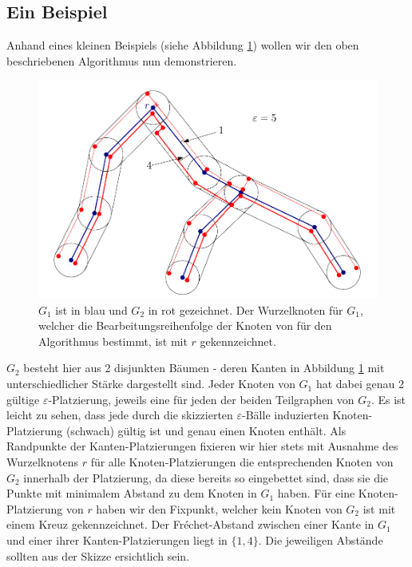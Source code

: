 \documentclass[a4paper, 12pt, twoside]{article}
\theoremstyle{Format1} %
\begin{document}
\subsection{Ein Beispiel}
Anhand eines kleinen Beispiels (siehe Abbildung \ref{min_sum_tree_0}) wollen wir den oben beschriebenen Algorithmus nun demonstrieren.

\begin{figure}[H]
    \centering
    \includegraphics[width=\textwidth]{min_sum_tree_0.pdf}
    \caption{$G_1$ ist in blau und $G_2$ in rot gezeichnet. Der Wurzelknoten für $G_1$, welcher die Bearbeitungsreihenfolge der Knoten von für den Algorithmus bestimmt,
	ist mit $r$ gekennzeichnet.
	}
    \label{min_sum_tree_0}
\end{figure}

$G_2$ besteht hier aus 2 disjunkten Bäumen - deren Kanten in Abbildung \ref{min_sum_tree_0} mit unterschiedlicher Stärke dargestellt sind.
Jeder Knoten von $G_1$ hat dabei genau 2 gültige $\varepsilon$-Platzierung, jeweils eine für jeden der beiden Teilgraphen von $G_2$.
Es ist leicht zu sehen, dass jede durch die skizzierten $\varepsilon$-Bälle induzierten Knoten-Platzierung (schwach) gültig ist und genau einen Knoten enthält.
Als Randpunkte der Kanten-Platzierungen fixieren wir hier stets mit Ausnahme des Wurzelknotens $r$ für alle Knoten-Platzierungen die entsprechenden Knoten von $G_2$ innerhalb der Platzierung,
da diese bereits so eingebettet sind, dass sie die Punkte mit minimalem Abstand zu dem Knoten in $G_1$ haben. Für eine Knoten-Platzierung von $r$ haben wir den Fixpunkt, welcher kein Knoten
von $G_2$ ist mit einem Kreuz gekennzeichnet. Der Fréchet-Abstand zwischen einer Kante in $G_1$ und einer ihrer Kanten-Platzierungen liegt in $\{1,4\}$.
Die jeweiligen Abstände sollten aus der Skizze ersichtlich sein.
\end{document}

